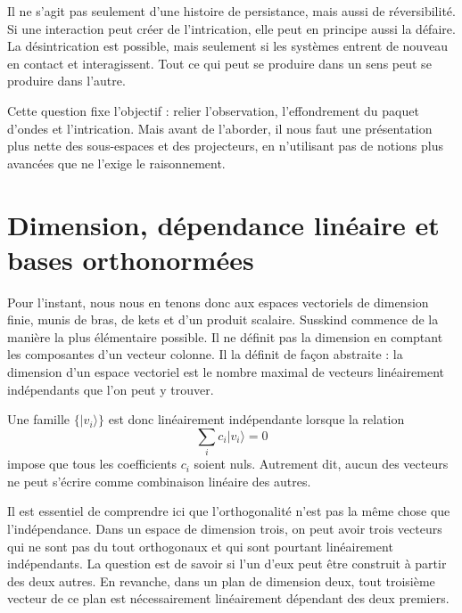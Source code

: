 Il ne s’agit pas seulement d’une histoire de persistance, mais aussi de réversibilité. Si une interaction peut créer de l’intrication, elle peut en principe aussi la défaire. La désintrication est possible, mais seulement si les systèmes entrent de nouveau en contact et interagissent. Tout ce qui peut se produire dans un sens peut se produire dans l’autre.

\begin{classroomqa}
\end{classroomqa}

Cette question fixe l’objectif : relier l’observation, l’effondrement du paquet d’ondes et l’intrication. Mais avant de l’aborder, il nous faut une présentation plus nette des sous-espaces et des projecteurs, en n’utilisant pas de notions plus avancées que ne l’exige le raisonnement.

\section{Dimension, dépendance linéaire et bases orthonormées}

Pour l’instant, nous nous en tenons donc aux espaces vectoriels de dimension finie, munis de bras, de kets et d’un produit scalaire. Susskind commence de la manière la plus élémentaire possible. Il ne définit pas la dimension en comptant les composantes d’un vecteur colonne. Il la définit de façon abstraite : la dimension d’un espace vectoriel est le nombre maximal de vecteurs linéairement indépendants que l’on peut y trouver.

Une famille \(\{|v_i\rangle\}\) est donc linéairement indépendante lorsque la relation
\begin{equation}
\sum_i c_i |v_i\rangle = 0
\end{equation}
impose que tous les coefficients \(c_i\) soient nuls. Autrement dit, aucun des vecteurs ne peut s’écrire comme combinaison linéaire des autres.

Il est essentiel de comprendre ici que l’orthogonalité n’est pas la même chose que l’indépendance. Dans un espace de dimension trois, on peut avoir trois vecteurs qui ne sont pas du tout orthogonaux et qui sont pourtant linéairement indépendants. La question est de savoir si l’un d’eux peut être construit à partir des deux autres. En revanche, dans un plan de dimension deux, tout troisième vecteur de ce plan est nécessairement linéairement dépendant des deux premiers.

